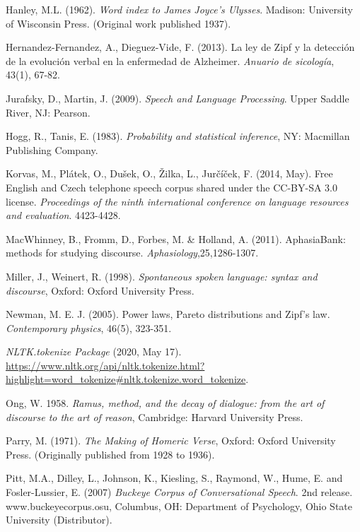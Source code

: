 \documentclass[12pt]{article}
\begin{document}
\begin{thebibliography}{50}
Hanley, M.L. (1962). \emph{Word index to James Joyce's Ulysses}. Madison: University of Wisconsin Press. (Original work published 1937).

Hernandez-Fernandez, A., Dieguez-Vide, F. (2013). La ley de Zipf y la detección de la evolución verbal en la enfermedad de Alzheimer. \emph{Anuario de sicología}, 43(1), 67-82.

Jurafsky, D., Martin, J. (2009). \emph{Speech and Language Processing}. Upper Saddle River, NJ: Pearson.

Hogg, R., Tanis, E. (1983). \emph{Probability and statistical inference}, NY: Macmillan Publishing Company.

Korvas, M., Plátek, O., Dušek, O., Žilka, L., Jurčíček, F. (2014, May). Free English and Czech telephone speech corpus shared under the CC-BY-SA 3.0 license. \emph{Proceedings of the ninth international conference on language resources and evaluation}. 4423-4428.

MacWhinney, B., Fromm, D., Forbes, M. \& Holland, A. (2011). AphasiaBank: methods for studying discourse. \emph{Aphasiology},25,1286-1307.

Miller, J., Weinert, R. (1998).  \emph{Spontaneous spoken language: syntax and discourse}, Oxford: Oxford University Press. 

Newman, M. E. J. (2005). Power laws, Pareto distributions and Zipf's law.  \emph{Contemporary physics}, 46(5), 323-351.

\emph{NLTK.tokenize Package} (2020, May 17).  \\ 
\url{https://www.nltk.org/api/nltk.tokenize.html?highlight=word_tokenize#nltk.tokenize.word_tokenize}.

Ong, W. 1958.  \emph{Ramus, method, and the decay of dialogue: from the art of discourse to the art of reason}, Cambridge: Harvard University Press.

Parry, M. (1971).  \emph{The Making of Homeric Verse}, Oxford: Oxford University Press. (Originally published from 1928 to 1936).

Pitt, M.A., Dilley, L., Johnson, K., Kiesling, S., Raymond, W., Hume, E. and Fosler-Lussier, E. (2007) \emph{Buckeye Corpus of Conversational Speech}.  2nd release. www.buckeyecorpus.osu, Columbus, OH: Department of Psychology, Ohio State University (Distributor).


\end{thebibliography}
\end{document}
